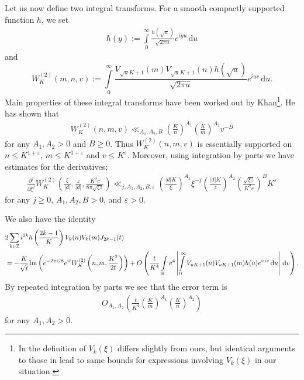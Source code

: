 \documentclass[a4paper,10pt,twoside]{amsart}
\theoremstyle{definition}
\numberwithin{equation}{section}
\newcommand\Z{\mathbb{Z}}
\newcommand\eps{\varepsilon}
\renewcommand{\Im}{\textnormal{Im}}
\renewcommand\:{\colon}
\begin{document}
Let us now define two integral transforms. For a smooth compactly supported function $h$, we set 
\begin{align*}
\hbar(y):=\int\limits_0^\infty\frac{h(\sqrt u)}{\sqrt{2\pi u}}e^{iyu}\,\mathrm d u
\end{align*}
and
\[W_K^{(2)}(m,n,v):=\int\limits_0^\infty \frac{V_{\sqrt u K+1}(m)V_{\sqrt u K+1}(n)h(\sqrt u)}{\sqrt{2\pi u}}e^{iuv}\,\mathrm d u.\]
Main properties of these integral transforms have been worked out by Khan\footnote{In \cite{Khan2010} the definition of $V_k(\xi)$ differs slightly from ours, but identical arguments to those in \cite{Khan2010} lead to same bounds for expressions involving $V_k(\xi)$ in our situation.}. He has shown \cite[(2.17)]{Khan2010} that
\begin{align}\label{W_K-2-bound}
W_K^{(2)}(n,m,v)\ll_{A_1,A_2,B}\left(\frac Kn\right)^{A_1}\left(\frac Km\right)^{A_2}v^{-B}
\end{align}
for any $A_1,A_2>0$ and $B\geq 0$. Thus $W_K^{(2)}(n,m,v)$ is essentially supported on $n\leq K^{1+\varepsilon}$, $m\leq K^{1+\varepsilon}$ and $v\leq K^\varepsilon$. Moreover, using integration by parts we have estimates for the derivatives;
\begin{align}\label{W2-der}
\frac{\partial^j}{\partial\xi^j}W_K^{(2)}\left(\frac{\xi}{|d|},\frac z{|d|},\frac {K^2c}{8\pi\sqrt{\xi z}}\right)\ll_{j,A_1,A_2,B,\eps}\left(\frac{|d|K}{\xi}\right)^{A_1}\xi^{-j}\left(\frac{|d|K}z\right)^{A_2}\left(\frac{\sqrt{\xi z}}{K^2c}\right)^B K^\eps
\end{align}
for any $j\geq 0$, $A_1,A_2,B>0$, and $\eps>0$.


We also have the identity \cite[(2.14)]{Khan2010}
\begin{align}\label{J-Bessel-avg-II}
&2\sum_{k\in\Z}i^{2k} h\left(\frac{2k-1}K\right)V_k(n)V_k(m)J_{2k-1}(t) \nonumber \\
&=-\frac K{\sqrt t}\Im\left(e^{-2\pi i/8}e^{it}W_K^{(2)}\left(n,m,\frac{K^2}{2t}\right)\right)+O\left(\frac t{K^4}\int\limits_{\mathbb R}v^4\left| \int\limits_0^\infty V_{uK+1}(n)V_{uK+1}(m)h(u)e^{iuv}\,\mathrm d u\right|\,\mathrm d v\right).
\end{align}
\noindent By repeated integration by parts we see that the error term is 
\begin{align}\label{error-bound}
O_{A_1,A_2}\left(\frac t{K^4}\left(\frac Km\right)^{A_1}\left(\frac Kn\right)^{A_2}\right)
\end{align}
for any $A_1,A_2>0$.
\end{document}
